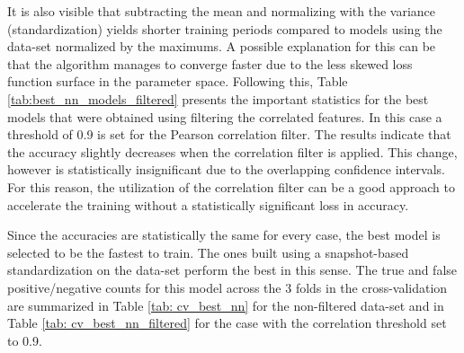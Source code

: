 \documentclass[paper=a4, fontsize=11pt]{scrartcl} %
\begin{document}
It is also visible that subtracting the mean and normalizing with the variance (standardization) yields shorter training periods compared to models using the data-set normalized by the maximums.
A possible explanation for this can be that the algorithm manages to converge faster due to the less skewed loss function surface in the parameter space.
Following this, Table \ref{tab:best_nn_models_filtered} presents the important statistics for the best models that were obtained using filtering the correlated features. 
In this case a threshold of 0.9 is set for the Pearson correlation filter.
The results indicate that the accuracy slightly decreases when the correlation filter is applied. 
This change, however is statistically insignificant due to the overlapping confidence intervals.
For this reason, the utilization of the correlation filter can be a good approach to accelerate the training without a statistically significant loss in accuracy.

Since the accuracies are statistically the same for every case, the best model is selected to be the fastest to train.
The ones built using a snapshot-based standardization on the data-set perform the best in this sense.
The true and false positive/negative counts for this model across the 3 folds in the cross-validation are summarized in Table \ref{tab: cv_best_nn} for the non-filtered data-set and in Table \ref{tab: cv_best_nn_filtered} for the case with the correlation threshold set to 0.9.
\end{document}
